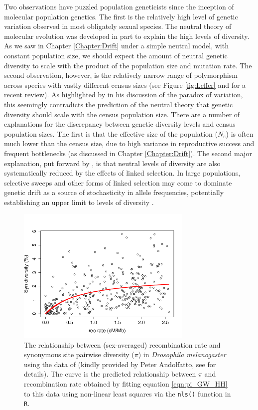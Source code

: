  Two observations have puzzled population geneticists since the
inception of molecular population genetics. The first is the relatively high
level of genetic variation observed in most obligately sexual species.  
The neutral theory of molecular evolution was developed in part to
explain the high levels of diversity. As we saw in Chapter \ref{Chapter:Drift} 
under a simple neutral model, with constant population size, we should expect the amount of neutral genetic
diversity to scale with the product of the population size and
mutation rate. The second observation, however, is the relatively narrow range 
of polymorphism across species with vastly different census sizes (see
Figure \ref{fig:Leffer} and \citet{leffler:12} for a recent review). 
As highlighted by \citet{Lewontin:74} in his discussion of the paradox
of variation, this seemingly contradicts the prediction of the neutral theory that
genetic diversity should scale with the census population size. There are a number of explanations for the discrepancy between genetic
diversity levels and census population sizes. The first is that the effective size of the population ($N_e$) is
often much lower than the census size, due to high variance in
reproductive success and frequent bottlenecks (as discussed in  Chapter \ref{Chapter:Drift}). 
The second major explanation, put forward by \citet{MaynardSmith:74},
is that neutral levels of diversity are also systematically reduced by the effects of linked selection. 
In large populations, selective sweeps and other forms of linked selection may come to dominate genetic drift as a
source of stochasticity in allele frequencies, potentially establishing an upper limit to levels of diversity \citep{Kaplan:89, Gillespie:00}. 

\begin{figure}
\begin{center}
\includegraphics[width=0.75\textwidth]{figures/Genomewide_HH.png}
\end{center}
\caption{The relationship between (sex-averaged) recombination rate and synonymous
  site pairwise diversity ($\pi$) in {\it Drosophila melanogaster}
  using the data of \citep{Shapiro:07} (kindly provided by Peter
  Andolfatto, see \citet{sella2009pervasive} for details). The curve is the
  predicted relationship between $\pi$ and recombination rate obtained
  by fitting equation \eqref{eqn:pi_GW_HH} to this data 
 using non-linear least squares via the {\tt nls()} function in {\tt R}.} \label{fig:GW_hitchhiking_reduction}
\end{figure}

